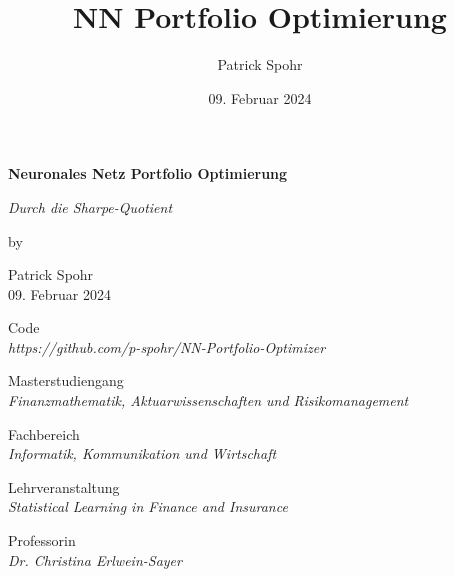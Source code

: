 \documentclass[12pt]{article}
\title{NN Portfolio Optimierung}
\date{09. Februar 2024}
\author{Patrick Spohr}
\begin{document}
    \begin{titlepage}
        
        \centering
        \Huge \textbf{Neuronales Netz Portfolio Optimierung}

        \vspace{7mm}
        
        \centering
        \Large \textit{Durch die Sharpe-Quotient} 

        \vspace{7mm}

        \centering
        \large by

        \vspace{7mm}

        \large Patrick Spohr
        \vspace{2mm}
        \\ 09. Februar 2024

        \vspace{4mm}

        \centering
        \large Code
        \\ \normalsize \textit{https://github.com/p-spohr/NN-Portfolio-Optimizer}

        \vspace{20mm}

        \centering
        \large Masterstudiengang
        \vspace{1mm}
        \\ \normalsize \textit{Finanzmathematik, Aktuarwissenschaften und Risikomanagement} 

        \vspace{5mm}

        \centering
        \large Fachbereich
        \vspace{1mm}
        \\ \normalsize \textit{Informatik, Kommunikation und Wirtschaft} 

        \vspace{5mm}

        \centering
        \large Lehrveranstaltung 
        \vspace{1mm}       
        \\ \normalsize \textit{Statistical Learning in Finance and Insurance} 

        \vspace{5mm}

        \centering
        \large Professorin
        \vspace{1mm}
        \\ \normalsize \textit{Dr. Christina Erlwein-Sayer} 


    \end{titlepage}
\end{document}
